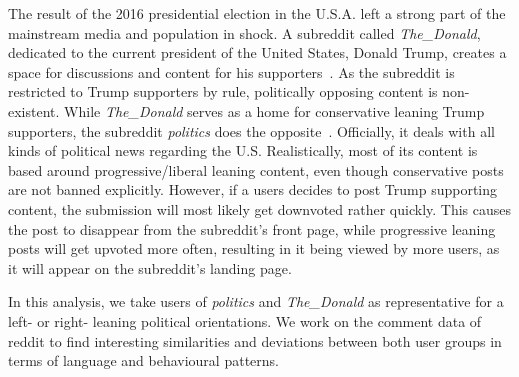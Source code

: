 \documentclass[runningheads,a4paper]{llncs}
\newcommand{\boards}[1]{\textit{politics} #1 \textit{The\_Donald}}
\begin{document}
	The result of the 2016 presidential election in the U.S.A. left a strong part of the mainstream
	media and population in shock.
	A subreddit called \textit{The\_Donald}, dedicated to the current president of
	the United States, Donald Trump, creates a space for discussions and content for his supporters~\cite{the-donald}.
	As the subreddit is restricted to Trump supporters by rule, politically opposing content is non-existent.
	While \textit{The\_Donald} serves as a home for conservative leaning Trump supporters,
	the subreddit \textit{politics} does the opposite~\cite{politics}. Officially, it deals with all kinds of
	political news regarding the U.S. Realistically, most of its content is based around progressive/liberal
	leaning content, even though conservative posts are not banned explicitly.
	However, if a users decides to post Trump supporting content,
	the submission will most likely get downvoted rather quickly. This causes the post to
	disappear from the subreddit's front page, while progressive leaning posts will get upvoted more often,
	resulting in it being viewed by more users, as it will appear on the subreddit's landing page.
	
	In this analysis, we take users of \boards{and} as representative for a left- or
	right- leaning political orientations. We work on the comment data of reddit to find interesting similarities and deviations between both user groups in terms of language and behavioural patterns.
	
	
\end{document}
